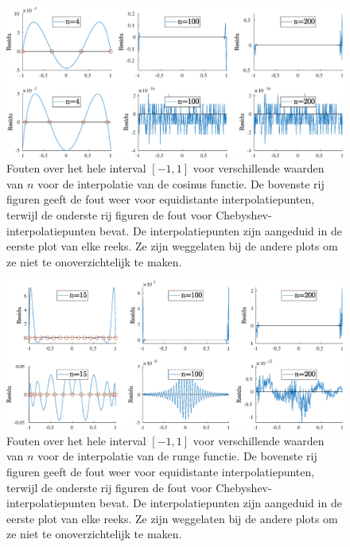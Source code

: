 \documentclass[a4paper, 12pt, titlepage, fleqn]{article}
\begin{document}
\begin{figure}
\centering
\includegraphics[width = \linewidth]{../Afbeeldingen/cos_heleFout.eps}
\caption[Fouten over het hele interval bij cosinus interpolatie]{Fouten over het hele interval $[-1,1]$ voor verschillende waarden van $n$ voor de interpolatie van de cosinus functie. De bovenste rij figuren geeft de fout weer voor equidistante interpolatiepunten, terwijl de onderste rij figuren de fout voor Chebyshev-interpolatiepunten bevat. De interpolatiepunten zijn aangeduid in de eerste plot van elke reeks. Ze zijn weggelaten bij de andere plots om ze niet te onoverzichtelijk te maken.}
\label{fig:cosHeleFout}
\end{figure}

\begin{figure}
\centering
\includegraphics[width = \linewidth]{../Afbeeldingen/runge_heleFout.eps}
\caption[Fouten over het hele interval bij Runge interpolatie]{Fouten over het hele interval $[-1,1]$ voor verschillende waarden van $n$ voor de interpolatie van de runge functie. De bovenste rij figuren geeft de fout weer voor equidistante interpolatiepunten, terwijl de onderste rij figuren de fout voor Chebyshev-interpolatiepunten bevat. De interpolatiepunten zijn aangeduid in de eerste plot van elke reeks. Ze zijn weggelaten bij de andere plots om ze niet te onoverzichtelijk te maken.}
\label{fig:rungeHeleFout}
\end{figure}
\end{document}
